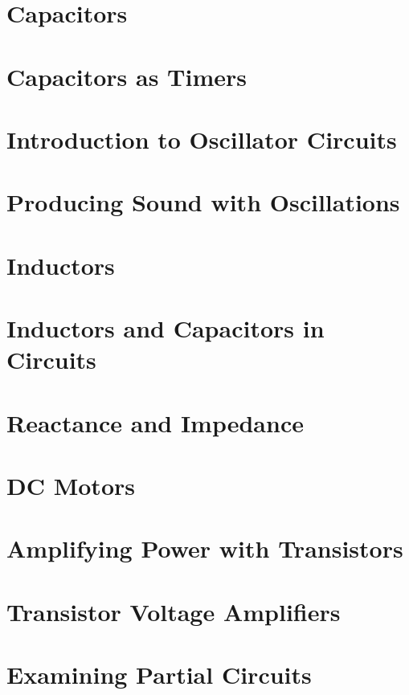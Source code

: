 \documentclass[twocolumn]{book}
\begin{document}
\chapter{Capacitors}



\chapter{Capacitors as Timers}



\chapter{Introduction to Oscillator Circuits}



\chapter{Producing Sound with Oscillations}



\chapter{Inductors}



\chapter{Inductors and Capacitors in Circuits}



\chapter{Reactance and Impedance}



\chapter{DC Motors}



\chapter{Amplifying Power with Transistors}



\chapter{Transistor Voltage Amplifiers}



\chapter{Examining Partial Circuits}


\end{document}
